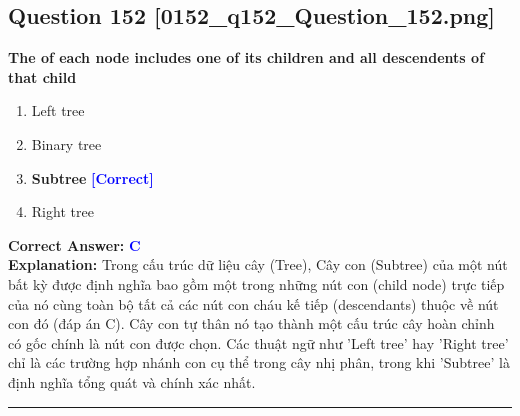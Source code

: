 \documentclass[11pt,a4paper]{article}
\begin{document}
\begin{minipage}{\textwidth}
\subsection*{Question 152 \quad \footnotesize{[0152\_q152\_Question\_152.png]}}
\noindent \textbf{The of each node includes one of its children and all descendents of that child}

\begin{enumerate}[label=\Alph*.]
    \item Left tree
    \item Binary tree
    \item \textbf{Subtree} \hfill \textcolor{blue}{\textbf{[Correct]}}
    \item Right tree
\end{enumerate}

\noindent \textbf{Correct Answer:} \textcolor{blue}{\textbf{C}} \\[2pt]
\noindent \textbf{Explanation:} Trong cấu trúc dữ liệu cây (Tree), Cây con (Subtree) của một nút bất kỳ được định nghĩa bao gồm một trong những nút con (child node) trực tiếp của nó cùng toàn bộ tất cả các nút con cháu kế tiếp (descendants) thuộc về nút con đó (đáp án C). Cây con tự thân nó tạo thành một cấu trúc cây hoàn chỉnh có gốc chính là nút con được chọn. Các thuật ngữ như 'Left tree' hay 'Right tree' chỉ là các trường hợp nhánh con cụ thể trong cây nhị phân, trong khi 'Subtree' là định nghĩa tổng quát và chính xác nhất.

\par\vspace{0.3cm}
\hrule
\vspace{0.3cm}
\end{minipage}
\end{document}
